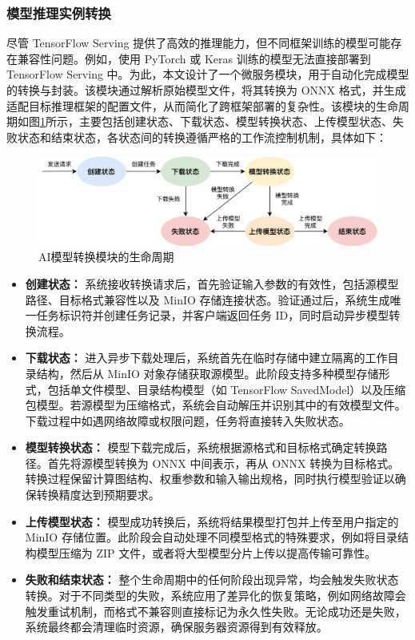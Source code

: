 \subsubsection{模型推理实例转换}

尽管 TensorFlow Serving 提供了高效的推理能力，但不同框架训练的模型可能存在兼容性问题。例如，使用 PyTorch 或 Keras 训练的模型无法直接部署到 TensorFlow Serving 中。为此，本文设计了一个微服务模块，用于自动化完成模型的转换与封装。该模块通过解析原始模型文件，将其转换为 ONNX 格式，并生成适配目标推理框架的配置文件，从而简化了跨框架部署的复杂性。该模块的生命周期如图\ref{fig:4-12trans}所示，主要包括创建状态、下载状态、模型转换状态、上传模型状态、失败状态和结束状态，各状态间的转换遵循严格的工作流控制机制，具体如下：

\begin{figure}[ht]
  \centering
  \includegraphics[width=\linewidth]{pics/4-12模型转换.png}
  \caption{AI模型转换模块的生命周期}
  \label{fig:4-12trans}
\end{figure}

\begin{itemize}
    \item \textbf{创建状态：} 系统接收转换请求后，首先验证输入参数的有效性，包括源模型路径、目标格式兼容性以及 MinIO 存储连接状态。验证通过后，系统生成唯一任务标识符并创建任务记录，并客户端返回任务 ID，同时启动异步模型转换流程。
    \item \textbf{下载状态：} 进入异步下载处理后，系统首先在临时存储中建立隔离的工作目录结构，然后从 MinIO 对象存储获取源模型。此阶段支持多种模型存储形式，包括单文件模型、目录结构模型（如 TensorFlow SavedModel）以及压缩包模型。若源模型为压缩格式，系统会自动解压并识别其中的有效模型文件。下载过程中如遇网络故障或权限问题，任务将直接转入失败状态。
    \item \textbf{模型转换状态：} 模型下载完成后，系统根据源格式和目标格式确定转换路径。首先将源模型转换为 ONNX 中间表示，再从 ONNX 转换为目标格式。转换过程保留计算图结构、权重参数和输入输出规格，同时执行模型验证以确保转换精度达到预期要求。
    \item \textbf{上传模型状态：} 模型成功转换后，系统将结果模型打包并上传至用户指定的 MinIO 存储位置。此阶段会自动处理不同模型格式的特殊要求，例如将目录结构模型压缩为 ZIP 文件，或者将大型模型分片上传以提高传输可靠性。
    \item \textbf{失败和结束状态：} 整个生命周期中的任何阶段出现异常，均会触发失败状态转换。对于不同类型的失败，系统应用了差异化的恢复策略，例如网络故障会触发重试机制，而格式不兼容则直接标记为永久性失败。无论成功还是失败，系统最终都会清理临时资源，确保服务器资源得到有效释放。
\end{itemize}

